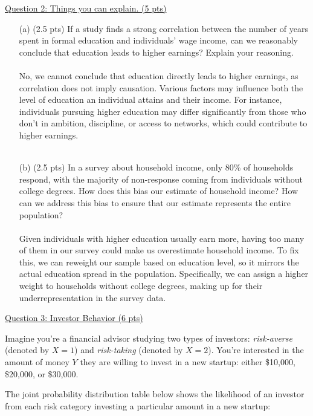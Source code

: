 \documentclass{./../../../Latex/tests}
\begin{document}
\newpage
\underline{Question 2: Things you can explain. (5 pts)}
\begin{enumerate}

\item[(a)] (2.5 pts) If a study finds a strong correlation between the number of years spent in formal education and individuals' wage income, can we reasonably conclude that education leads to higher earnings? Explain your reasoning. \\~\\
No, we cannot conclude that education directly leads to higher earnings, as correlation does not imply causation. Various factors may influence both the level of education an individual attains and their income. For instance, individuals pursuing higher education may differ significantly from those who don't in ambition, discipline, or access to networks, which could contribute to higher earnings.\\~\\


\item[(b)] (2.5 pts) In a survey about household income, only 80\% of households respond, with the majority of non-response coming from individuals without college degrees. How does this bias our estimate of household income? How can we address this bias to ensure that our estimate represents the entire population? \\~\\
Given individuals with higher education usually earn more, having too many of them in our survey could make us overestimate household income. To fix this, we can reweight our sample based on education level, so it mirrors the actual education spread in the population. Specifically, we can assign a higher weight to households without college degrees, making up for their underrepresentation in the survey data.
\end{enumerate}


\newpage
\underline{Question 3: Investor Behavior (6 pts)}

Imagine you're a financial advisor studying two types of investors: \textit{risk-averse} (denoted by $X=1$) and \textit{risk-taking} (denoted by $X=2$). You're interested in the amount of money $Y$ they are willing to invest in a new startup: either \$10,000, \$20,000, or \$30,000.

The joint probability distribution table below shows the likelihood of an investor from each risk category investing a particular amount in a new startup: \\
\end{document}
